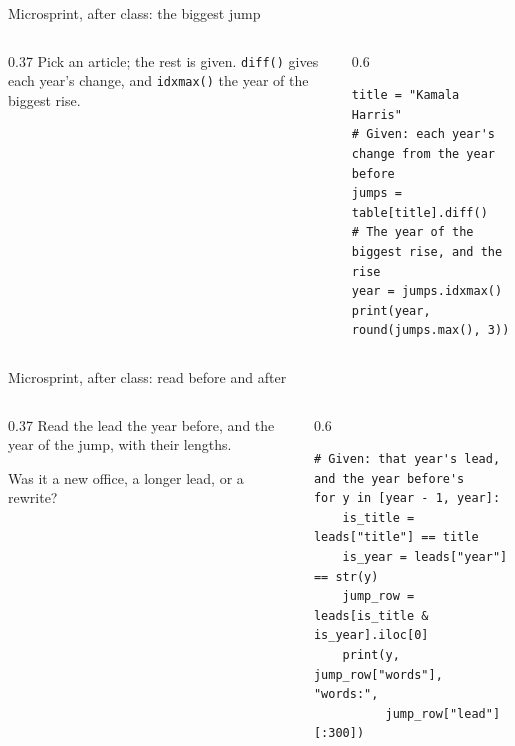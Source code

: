 \documentclass[9pt,aspectratio=169]{beamer}
\begin{document}
\begin{frame}[fragile]{Microsprint, after class: the biggest jump}
    \begin{columns}[T]
        \begin{column}{0.37\textwidth}
            Pick an article; the rest is given. \texttt{diff()} gives each year's change, and \texttt{idxmax()} the year of the biggest rise.
        \end{column}
        \begin{column}{0.6\textwidth}
\begin{lstlisting}
title = "Kamala Harris"
# Given: each year's change from the year before
jumps = table[title].diff()
# The year of the biggest rise, and the rise
year = jumps.idxmax()
print(year, round(jumps.max(), 3))
\end{lstlisting}
        \end{column}
    \end{columns}
\end{frame}

\begin{frame}[fragile]{Microsprint, after class: read before and after}
    \begin{columns}[T]
        \begin{column}{0.37\textwidth}
            Read the lead the year before, and the year of the jump, with their lengths.

            \medskip
            Was it a new office, a longer lead, or a rewrite?
        \end{column}
        \begin{column}{0.6\textwidth}
\begin{lstlisting}
# Given: that year's lead, and the year before's
for y in [year - 1, year]:
    is_title = leads["title"] == title
    is_year = leads["year"] == str(y)
    jump_row = leads[is_title & is_year].iloc[0]
    print(y, jump_row["words"], "words:",
          jump_row["lead"][:300])
\end{lstlisting}
        \end{column}
    \end{columns}
\end{frame}
\end{document}
